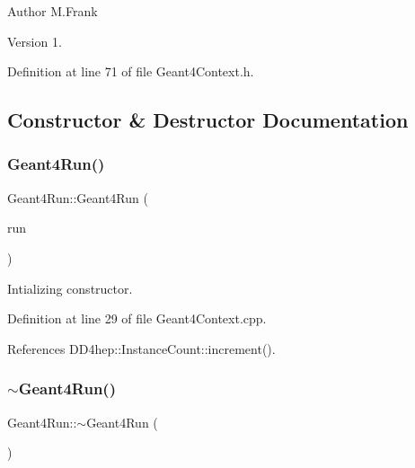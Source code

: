 \begin{DoxyAuthor}{Author}
M.\+Frank 
\end{DoxyAuthor}
\begin{DoxyVersion}{Version}
1. 
\end{DoxyVersion}


Definition at line 71 of file Geant4\+Context.\+h.



\subsection{Constructor \& Destructor Documentation}
\hypertarget{class_d_d4hep_1_1_simulation_1_1_geant4_run_a93e0b66a97b9b04f65c1d59882d248f3}{}\label{class_d_d4hep_1_1_simulation_1_1_geant4_run_a93e0b66a97b9b04f65c1d59882d248f3} 
\subsubsection{\texorpdfstring{Geant4\+Run()}{Geant4Run()}}
{\footnotesize\ttfamily Geant4\+Run\+::\+Geant4\+Run (\begin{DoxyParamCaption}\item[{const G4\+Run $\ast$}]{run }\end{DoxyParamCaption})}



Intializing constructor. 



Definition at line 29 of file Geant4\+Context.\+cpp.



References D\+D4hep\+::\+Instance\+Count\+::increment().

\hypertarget{class_d_d4hep_1_1_simulation_1_1_geant4_run_a9a508d7ab8cb68013b9e3cd370c2374a}{}\label{class_d_d4hep_1_1_simulation_1_1_geant4_run_a9a508d7ab8cb68013b9e3cd370c2374a} 
\subsubsection{\texorpdfstring{$\sim$\+Geant4\+Run()}{~Geant4Run()}}
{\footnotesize\ttfamily Geant4\+Run\+::$\sim$\+Geant4\+Run (\begin{DoxyParamCaption}{ }\end{DoxyParamCaption})\hspace{0.3cm}{\ttfamily [virtual]}}



